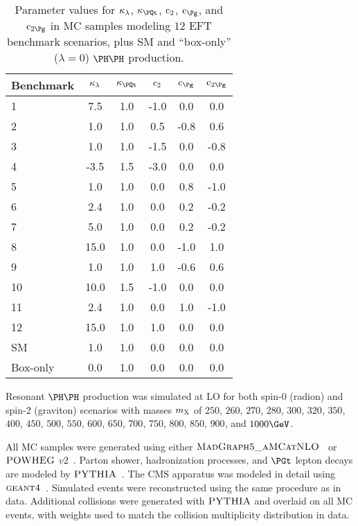 \begin{table}[!h]
\begin{center}
\begin{tabular}{|l|c|c|c|c|c|}

\hline
Benchmark & $\kappa_{\lambda}$  & $\kappat$ & $\text{c}_{2}$ & $\cg$ &  $\cgg$ \\
\hline
1         & 7.5        & 1.0       & -1.0    & 0.0   & 0.0  \\
2         & 1.0        & 1.0       &  0.5    & -0.8  & 0.6  \\
3         & 1.0        & 1.0       & -1.5    & 0.0   & -0.8 \\
4         & -3.5       & 1.5       & -3.0    & 0.0   & 0.0  \\
5         & 1.0        & 1.0       & 0.0     & 0.8   & -1.0 \\
6         & 2.4        & 1.0       & 0.0     & 0.2   & -0.2 \\
7         & 5.0        & 1.0       & 0.0     & 0.2   & -0.2 \\
8         & 15.0       & 1.0       & 0.0     & -1.0  & 1.0  \\
9         & 1.0        & 1.0       & 1.0     & -0.6  & 0.6  \\
10        & 10.0       & 1.5       & -1.0    & 0.0   & 0.0  \\
11        & 2.4        & 1.0       & 0.0     & 1.0   & -1.0 \\
12        & 15.0       & 1.0       & 1.0     & 0.0   & 0.0  \\
\hline
SM        & 1.0        & 1.0       & 0.0     & 0.0   & 0.0  \\
Box-only  & 0.0        & 1.0       & 0.0     & 0.0   & 0.0  \\
\hline

\end{tabular}
\end{center}
\caption{
  Parameter values for $\kappa_{\lambda}$, $\kappat$, $\text{c}_{2}$, $\cg$, and
  $\cgg$ in MC samples modeling $12$ EFT benchmark scenarios, plus SM
  and ``box-only'' ($\lambda = 0$) $\HH$ production.
}
\label{tab:HH_benchmarks}
\end{table}

Resonant $\HH$ production was simulated at LO for both spin-0 (radion) and spin-2 (graviton)
scenarios with masses $m_{\textrm{X}}$ of $250$, $260$, $270$, $280$, $300$, $320$, $350$, $400$, $450$, $500$, $550$, $600$,
$650$, $700$, $750$, $800$, $850$, $900$, and $1000\GeV$.

All MC samples were generated using either $\textsc{MadGraph5\_aMCatNLO}$~\cite{Alwall:2014hca} or
$\textsc{POWHEG}$ $v2$~\cite{Nason:2004rx,Frixione:2007vw,Alioli:2010xd}.  Parton shower, hadronization
processes, and $\PGt$ lepton decays are modeled by
$\textsc{PYTHIA}$~\cite{PYTHIA_CUETP8M1tune_CMS,PYTHIA_CUETP8M2tune_CMS,Sirunyan:2019dfx,PYTHIA_MonashTune}.
The CMS apparatus was modeled in detail using $\textsc{geant4}$~\cite{Agostinelli:2002hh}.  Simulated events
were reconstructed using the same procedure as in data.  Additional collisions were generated with $\textsc{PYTHIA}$ and
overlaid on all MC events, with weights used to match the collision multiplicity distribution in data.
